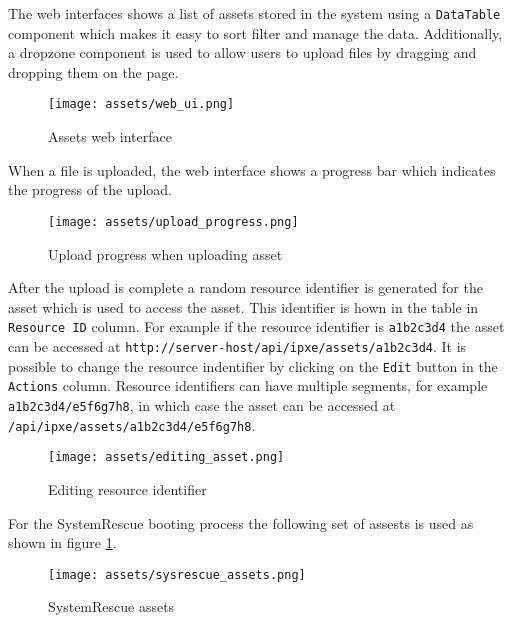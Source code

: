 \documentclass[../main.tex]{subfiles}
\begin{document}
The web interfaces shows a list of assets stored in the system using a \texttt{DataTable} component which makes it easy to sort filter and manage the data.
Additionally, a dropzone component is used to allow users to upload files by dragging and dropping them on the page.

\begin{figure}[H]
  \centering
  \texttt{[image: assets/web\_ui.png]}
  \caption{Assets web interface}
\end{figure}

When a file is uploaded, the web interface shows a progress bar which indicates the progress of the upload.

\begin{figure}[H]
  \centering
  \texttt{[image: assets/upload\_progress.png]}
  \caption{Upload progress when uploading asset}
\end{figure}

After the upload is complete a random resource identifier is generated for the asset which is used to access the asset.
This identifier is hown in the table in \texttt{Resource ID} column.
For example if the resource identifier is \texttt{a1b2c3d4} the asset can be accessed at \texttt{http://server-host/api/ipxe/assets/a1b2c3d4}.
It is possible to change the resource indentifier by clicking on the \texttt{Edit} button in the \texttt{Actions} column.
Resource identifiers can have multiple segments, for example \texttt{a1b2c3d4/e5f6g7h8}, in which case the asset can be accessed at \texttt{/api/ipxe/assets/a1b2c3d4/e5f6g7h8}.

\begin{figure}[H]
  \centering
  \texttt{[image: assets/editing\_asset.png]}
  \caption{Editing resource identifier}
\end{figure}

For the SystemRescue booting process the following set of assests is used as shown in figure \ref{fig:sysrescue-assets}.

\begin{figure}[H]
  \centering
  \texttt{[image: assets/sysrescue\_assets.png]}
  \caption{SystemRescue assets}
  \label{fig:sysrescue-assets}
\end{figure}
\end{document}
